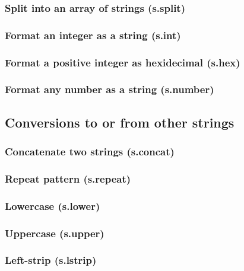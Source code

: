 \documentclass{article}
\theoremstyle{definition}
\begin{document}
\subsubsection{Split into an array of strings (s.split)}

\subsubsection{Format an integer as a string (s.int)}

\subsubsection{Format a positive integer as hexidecimal (s.hex)}

\subsubsection{Format any number as a string (s.number)}

\subsection{Conversions to or from other strings}

\subsubsection{Concatenate two strings (s.concat)}

\subsubsection{Repeat pattern (s.repeat)}

\subsubsection{Lowercase (s.lower)}

\subsubsection{Uppercase (s.upper)}

\subsubsection{Left-strip (s.lstrip)}
\end{document}
